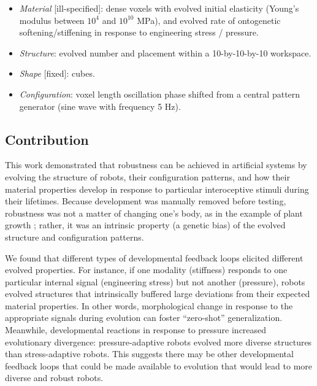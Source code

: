 \begin{itemize}
    \item \textit{Material} [ill-specified]: dense voxels with evolved initial elasticity (Young's modulus between $10^4$ and $10^{10}$ MPa), and evolved rate of ontogenetic softening/stiffening in response to engineering stress / pressure.
    \item \textit{Structure}: evolved number and placement within a 10-by-10-by-10 workspace.
    \item \textit{Shape} [fixed]: cubes.
    \item \textit{Configuration}: voxel length oscillation phase shifted from a central pattern generator (sine wave with frequency 5 Hz).
\end{itemize}



\subsection{Contribution}


This work demonstrated that robustness can be achieved in artificial systems by evolving the structure of robots, their configuration patterns, and how
their material properties develop in response to particular interoceptive stimuli during their lifetimes.
Because development was manually removed before testing, robustness was not a matter of changing one's body, as in the example of plant growth \citep{sultan2000phenotypic}; 
rather, it was an intrinsic property (a genetic bias) of the evolved structure and configuration patterns.

We found that different types of developmental feedback loops elicited different evolved properties.
For instance, if one modality (stiffness) responds to one particular internal signal (engineering stress) but not another (pressure), robots evolved structures that intrinsically buffered large deviations from their expected material properties.
In other words, morphological change in response to the appropriate signals during evolution can foster ``zero-shot'' generalization.
Meanwhile, developmental reactions in response to pressure increased evolutionary divergence: 
pressure-adaptive robots evolved more diverse 
structures than stress-adaptive robots.
This suggests
there may be other developmental feedback loops that could be made available to evolution
that would lead to more diverse and robust robots.

